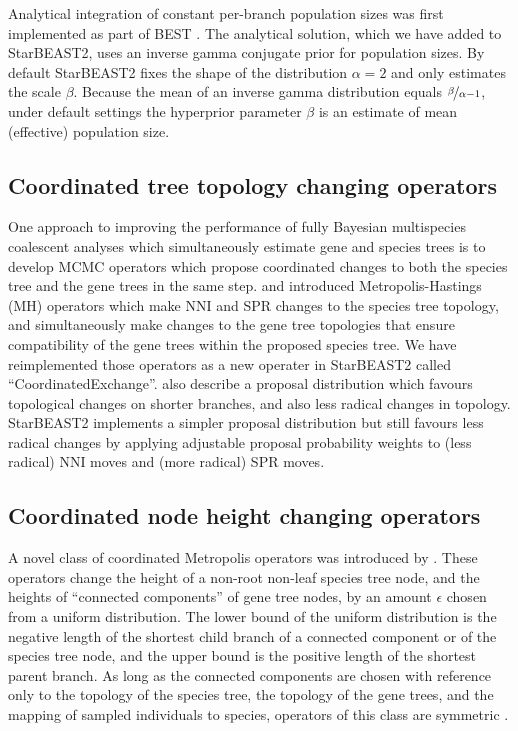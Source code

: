 \documentclass[12pt]{article}
\begin{document}
Analytical integration of constant per-branch population sizes was first
implemented as part of BEST \citep{EVO:EVO414}. The analytical solution, which
we have added to StarBEAST2, uses an inverse gamma conjugate prior for
population sizes. By default StarBEAST2 fixes the shape of the distribution
$\alpha = 2$ and only estimates the scale $\beta$. Because the mean of an
inverse gamma distribution equals $\nicefrac{\beta}{\alpha - 1}$, under default
settings the hyperprior parameter $\beta$ is an estimate of mean (effective)
population size.

\subsection*{Coordinated tree topology changing operators}

One approach to improving the performance of fully Bayesian multispecies
coalescent analyses which simultaneously estimate gene and species trees is to
develop MCMC operators which propose coordinated changes to both the species
tree and the gene trees in the same step. \cite{Yang01122014} and
\cite{2015arXiv151203843R} introduced Metropolis-Hastings (MH) operators which make
NNI and SPR changes to the species tree topology, and simultaneously make
changes to the gene tree topologies that ensure compatibility of the gene trees
within the proposed species tree. We have reimplemented those operators as a new
operater in StarBEAST2 called ``CoordinatedExchange''.
\cite{2015arXiv151203843R} also describe a proposal distribution which favours
topological changes on shorter branches, and also less radical changes in
topology. StarBEAST2 implements a simpler proposal distribution but still
favours less radical changes by applying adjustable proposal probability
weights to (less radical) NNI moves and (more radical) SPR moves.

\subsection*{Coordinated node height changing operators}

A novel class of coordinated Metropolis operators was introduced by
\cite{Jones010199}. These operators change the height of a non-root non-leaf
species tree node, and the heights of ``connected components'' of gene tree
nodes, by an amount $\epsilon$ chosen from a uniform distribution.
The lower bound of the uniform distribution is the negative length of
the shortest child branch of a connected component or of the species tree node,
and the upper bound is the positive length of the shortest parent branch. As
long as the connected components are chosen with reference only to the topology
of the species tree, the topology of the gene trees, and the mapping of
sampled individuals to species, operators of this class are symmetric
\citep{Jones010199}.
\end{document}
